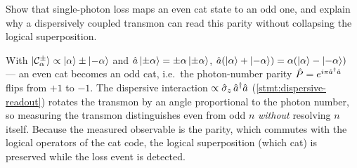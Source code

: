 \begin{exercise}
Show that single-photon loss maps an even cat state to an odd one, and
explain why a dispersively coupled transmon can read this parity without
collapsing the logical superposition.
\begin{solution}
With $\ket{\mathcal C^\pm_\alpha}\propto\ket{\alpha}\pm\ket{-\alpha}$ and
$\hat{a}\ket{\pm\alpha}=\pm\alpha\ket{\pm\alpha}$,
$\hat{a}(\ket{\alpha}+\ket{-\alpha})=\alpha(\ket{\alpha}-\ket{-\alpha})$ ---
an even cat becomes an odd cat, i.e.\ the photon-number parity
$\hat{P}=e^{i\pi\hat{a}^\dagger\hat{a}}$ flips from $+1$ to $-1$. The dispersive
interaction $\propto\hat\sigma_z\,\hat{a}^\dagger\hat{a}$
(\cref{stmt:dispersive-readout}) rotates the transmon by an angle
proportional to the photon number, so measuring the transmon distinguishes
even from odd $n$ \emph{without} resolving $n$ itself. Because the
measured observable is the parity, which commutes with the logical
operators of the cat code, the logical superposition (which cat) is
preserved while the loss event is detected.
\end{solution}
\end{exercise}

